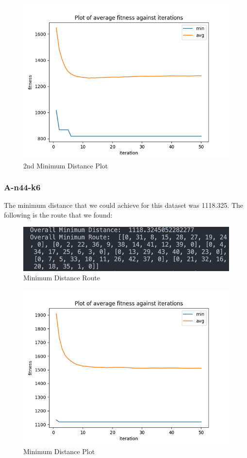 \documentclass{article}
\begin{document}
\begin{figure}[H]
  \centering
  \includegraphics[width=1\linewidth]{images/min_n32-k5.png}
  \caption{2nd Minimum Distance Plot}
\end{figure}

\subsubsection{A-n44-k6}
The minimum distance that we could achieve for this dataset was 1118.325. The following is the route that we found:
\begin{figure}[H]
  \centering
  \includegraphics[width=1\linewidth]{images/min_dist_n44-k6.png}
  \caption{Minimum Distance Route}
\end{figure}
\begin{figure}[H]
  \centering
  \includegraphics[width=1\linewidth]{images/min_n44-k6.png}
  \caption{Minimum Distance Plot}
\end{figure}
\end{document}
